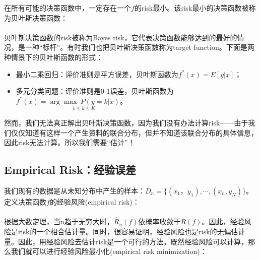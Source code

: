 \documentclass[a4paper]{article}
\begin{document}
	在所有可能的决策函数中，一定存在一个$f$的risk最小。该risk最小的决策函数被称为贝叶斯决策函数：\\
	
	\noindent{}\\
	
	贝叶斯决策函数的risk被称为Bayes risk，它代表决策函数能够达到的最好的情况，是一种“标杆”。有时我们也把贝叶斯决策函数称为target function。下面是两种情景下的贝叶斯函数的形式：
	
	\begin{itemize}
		\item 最小二乘回归：评价准则是平方误差，贝叶斯函数为$f^*(x) = E[y|x]$；
		\item 多元分类问题：评价准则是0-1误差，贝叶斯函数为$f^*(x)=\underset{1\le k \le K}{\arg\max\ P(y=k | x)}$。
	\end{itemize}
	
	然而，我们无法真正解出贝叶斯决策函数，因为我们没有办法计算risk——由于我们仅仅知道有这样一个产生资料的联合分布，但并不知道该联合分布的具体信息，因此risk无法计算。所以我们需要“估计”！

	\subsection{Empirical Risk：经验误差}	
	
	我们现有的数据是从未知分布中产生的样本：$D_n = \{(x_1， y_1), \cdots,(x_n,y_N)\}$。定义决策函数$f$的经验风险(empirical risk)：\\
	
	\noindent{}\\
	
	根据大数定理，当n趋于无穷大时，$\hat{R}_n(f)$依概率收敛于$R(f)$。因此，经验风险是risk的一个相合估计量。同时，很容易证明，经验风险也是risk的无偏估计量。因此，用经验风险去估计risk是一个可行的方法。既然经验风险可以计算，那么我们就可以进行经验风险最小化(empirical risk minimization)：\\
	
\end{document}
